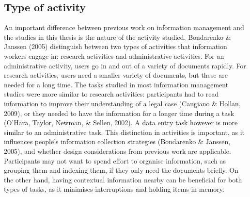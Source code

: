 \subsection{Type of activity}
An important difference between previous work on information management and the studies in this thesis is the nature of the activity studied. Bondarenko \& Janssen (2005) distinguish between two types of activities that information workers engage in: research activities and administrative activities. For an administrative activity, users go in and out of a variety of documents rapidly. For research activities, users need a smaller variety of documents, but these are needed for a long time. The tasks studied in most information management studies were more similar to research activities: participants had to read information to improve their understanding of a legal case (Cangiano \& Hollan, 2009), or they needed to have the information for a longer time during a task (O'Hara, Taylor, Newman, \& Sellen, 2002). A data entry task however is more similar to an administrative task. This distinction in activities is important, as it influences people's information collection strategies (Bondarenko \& Janssen, 2005), and whether design considerations from previous work are applicable. Participants may not want to spend effort to organise information, such as grouping them and indexing them, if they only need the documents briefly. On the other hand, having contextual information nearby can be beneficial for both types of tasks, as it minimises interruptions and holding items in memory.


